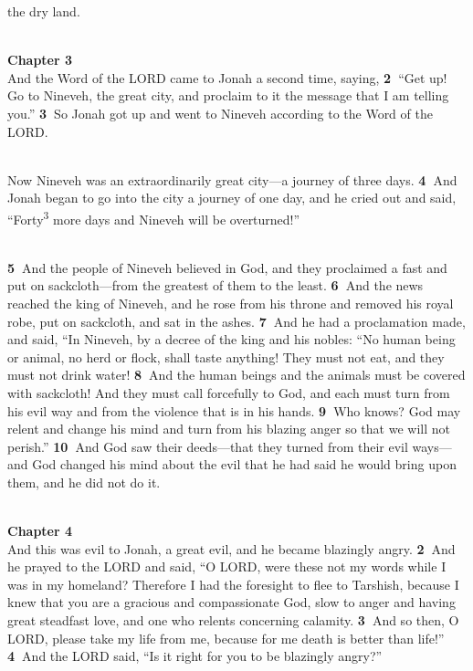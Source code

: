 \documentclass[
]{article}
\begin{document}
the dry land.\\
\strut \\
\textbf{Chapter 3~}\\
And the Word of the LORD came to Jonah a second time, saying,
\textbf{2~}``Get up! Go to Nineveh, the great city, and proclaim to it
the message that I am telling you.'' \textbf{3~}So Jonah got up and went
to Nineveh according to the Word of the LORD.\\
\strut \\
Now Nineveh was an extraordinarily great city---a journey of three days.
\textbf{4~}And Jonah began to go into the city a journey of one day, and
he cried out and said, ``Forty\textsuperscript{3} more days and Nineveh
will be overturned!''\\
\strut \\
\textbf{5~}And the people of Nineveh believed in God, and they
proclaimed a fast and put on sackcloth---from the greatest of them to
the least. \textbf{6~}And the news reached the king of Nineveh, and he
rose from his throne and removed his royal robe, put on sackcloth, and
sat in the ashes. \textbf{7~}And he had a proclamation made, and said,
``In Nineveh, by a decree of the king and his nobles: ``No human being
or animal, no herd or flock, shall taste anything! They must not eat,
and they must not drink water! \textbf{8~}And the human beings and the
animals must be covered with sackcloth! And they must call forcefully to
God, and each must turn from his evil way and from the violence that is
in his hands. \textbf{9~}Who knows? God may relent and change his mind
and turn from his blazing anger so that we will not perish.''
\textbf{10~}And God saw their deeds---that they turned from their evil
ways---and God changed his mind about the evil that he had said he would
bring upon them, and he did not do it.\\
\strut \\
\textbf{Chapter 4}\\
And this was evil to Jonah, a great evil, and he became blazingly angry.
\textbf{2~}And he prayed to the LORD and said, ``O LORD, were these not
my words while I was in my homeland? Therefore I had the foresight to
flee to Tarshish, because I knew that you are a gracious and
compassionate God, slow to anger and having great steadfast love, and
one who relents concerning calamity. \textbf{3~}And so then, O LORD,
please take my life from me, because for me death is better than life!''
\textbf{4~}And the LORD said, ``Is it right for you to be blazingly
angry?''\\
\end{document}
